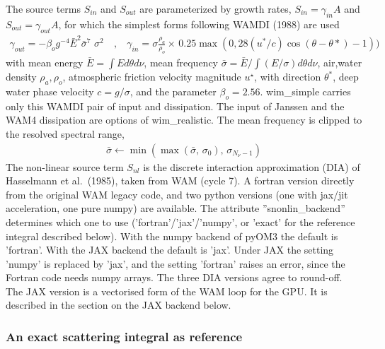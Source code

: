 \documentclass[12pt]{article}
\newcommand{\beq}  { \begin{eqnarray} }
\newcommand{\eeq}  { \end{eqnarray}}
\begin{document}
The source terms $S_{in}$ and $S_{out}$ are parameterized by growth rates,
$ S_{in} = \gamma_{in} A$ and $S_{out}=  \gamma_{out} A$, 
for which the simplest forms  following  WAMDI (1988) are used
\beq \label{eq:gammas}
 \gamma_{out} = -  \beta_{o} g^{-4}  \bar E^2 \bar \sigma^7 \, \,     \sigma^2  ~&,&~
 \gamma_{in} =   \sigma\frac{\rho_a}{\rho_o} \times \, 
    0.25 \max\left( 0,
     28 (u^*/c)  \cos(\theta - \theta*) -1  \right) )
 \eeq
with mean energy $\bar E = \int E d \theta d\nu$,  mean frequency
$\bar \sigma = \bar E/ \int (E/\sigma) d \theta d\nu$,
air,water density  $\rho_a,\rho_o$, atmospheric friction velocity magnitude $u^{\star}$,
with direction $ \theta^*$, deep water phase velocity $c = g/  \sigma$,
and the parameter $\beta_{o} = 2.56 $.
wim\_simple carries only this WAMDI pair of input and dissipation.
The input of Janssen and the WAM4 dissipation are options of wim\_realistic.
The mean frequency is clipped to the resolved spectral range,
\beq
\bar\sigma \leftarrow \min\!\left(\max(\bar\sigma,\, \sigma_0),\, \sigma_{N_\nu-1}\right)
\eeq
The non-linear source term $S_{nl}$ is the discrete interaction approximation (DIA)
of Hasselmann et al.\ (1985), taken from WAM (cycle 7).
A fortran version directly from the original WAM legacy code, 
and two python versions (one with jax/jit acceleration, one pure numpy) are available.
The attribute ''snonlin\_backend'' determines which one to use ('fortran'/'jax'/'numpy',
or 'exact' for the reference integral described below).
With the numpy backend of pyOM3 the default is 'fortran'.
With the JAX backend the default is 'jax'.
Under JAX the setting 'numpy' is replaced by 'jax', and the setting 'fortran' raises an error,
since the Fortran code needs numpy arrays.
The three DIA versions agree to round-off.
The JAX version is a vectorised form of the WAM loop for the GPU.
It is described in the section on the JAX backend below.

\subsubsection*{An exact scattering integral as reference}
\end{document}
